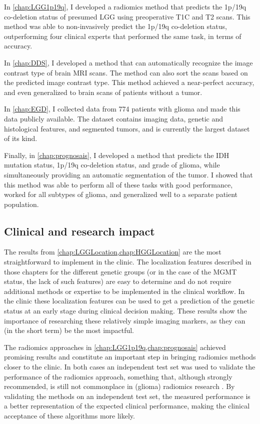 In \cref{chap:LGG1p19q}, I developed a radiomics method that predicts the 1p/19q co-deletion status of presumed \gls{LGG} using preoperative \acrlong{T1C} and \acrlong{T2} scans.
This method was able to non-invasively predict the 1p/19q co-deletion status, outperforming four clinical experts that performed the same task, in terms of accuracy.

In \cref{chap:DDS}, I developed a method that can automatically recognize the image contrast type of brain \gls{MRI} scans.
The method can also sort the scans based on the predicted image contrast type.
This method achieved a near-perfect accuracy, and even generalized to brain scans of patients without a \gls{tumor}.

In \cref{chap:EGD}, I collected data from 774 patients with glioma and made this data publicly available.
The dataset contains imaging data, genetic and histological features, and segmented \glspl{tumor}, and is currently the largest dataset of its kind.

Finally, in \cref{chap:prognosais}, I developed a method that predicts the \gls{IDH} mutation status, 1p/19q co-deletion status, and grade of glioma, while simultaneously providing an automatic segmentation of the \gls{tumor}.
I showed that this method was able to perform all of these tasks with good performance, worked for all subtypes of glioma, and generalized well to a separate patient population.


\subsection{Clinical and research impact}

The results from \cref{chap:LGGLocation,chap:HGGLocation} are the most straightforward to implement in the clinic.
The localization features described in those chapters for the different genetic groups (or in the case of the \gls{MGMT} status, the lack of such features) are easy to determine and do not require additional methods or expertise to be implemented in the clinical workflow.
In the clinic these localization features can be used to get a prediction of the genetic status at an early stage during clinical decision making.
These results show the importance of researching these relatively simple imaging markers, as they can (in the short term) be the most impactful.

The radiomics approaches in \cref{chap:LGG1p19q,chap:prognosais} achieved promising results and constitute an important step in bringing radiomics methods closer to the clinic.
In both cases an independent test set was used to validate the performance of the radiomics approach, something that, although strongly recommended, is still not commonplace in (glioma) radiomics research \autocite{gillies2016radiomics, rizzo2018radiomics, lohmann2020radiomics, yip2016applications}.
By validating the methods on an independent test set, the measured performance is a better representation of the expected clinical performance, making the clinical acceptance of these algorithms more likely.

